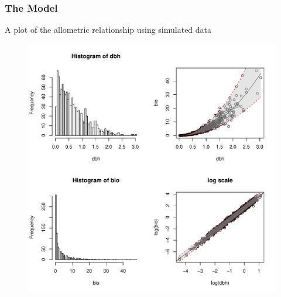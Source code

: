 \documentclass{beamer}
\begin{document}
\begin{frame}
  \frametitle{The Model}
  A plot of the allometric relationship using simulated data
  \begin{figure}
    \centering
    \includegraphics[scale = 0.25]{dbhModel}
  \end{figure}
\end{frame}
%
\end{document}
